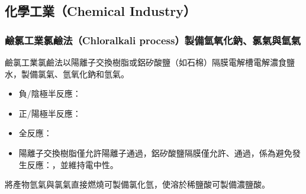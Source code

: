 \documentclass[a4paper,12pt]{report}
\begin{document}
\begin{itemize}
\section{化學工業（Chemical Industry）}
\subsubsection{鹼氯工業氯鹼法（Chloralkali process）製備氫氧化鈉、氯氣與氫氣}
鹼氯工業氯鹼法以陽離子交換樹脂或鋁矽酸鹽（如石棉）隔膜電解槽電解濃食鹽水，製備氯氣、氫氧化鈉和氫氣。
\begin{itemize}
\item 負/陰極半反應：
\item 正/陽極半反應：
\item 全反應：
\item 陽離子交換樹脂僅允許陽離子通過，鋁矽酸鹽隔膜僅允許、通過，係為避免發生反應：，並維持電中性。
\end{itemize}
將產物氫氣與氯氣直接燃燒可製備氯化氫，使溶於稀鹽酸可製備濃鹽酸。

\end{itemize}
\end{document}
